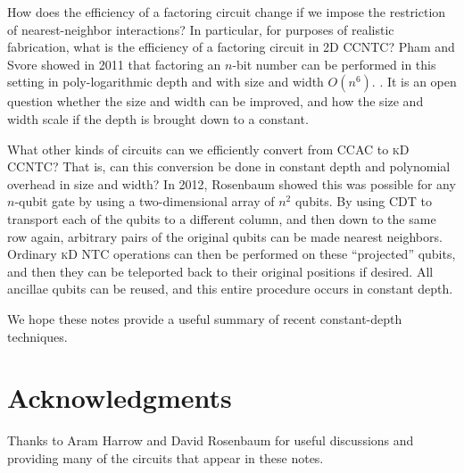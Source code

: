 \documentclass{article}
\begin{document}
How does the efficiency of a factoring circuit change if we impose the
restriction of nearest-neighbor interactions? In particular, for purposes
of realistic fabrication, what is the efficiency of a factoring circuit in
\textsc{2D CCNTC}? Pham and Svore showed in 2011 that factoring an $n$-bit
number can be
performed in this setting in poly-logarithmic depth and with size
and width $O(n^6)$. \cite{Pham2012b}. It is an open question whether the
size and width can be improved, and how the size and width scale if the depth
is brought down to a constant.

What other kinds of circuits can we efficiently convert
from \textsc{CCAC} to \textsc{kD CCNTC}? That is, can this conversion
be done in constant depth and
polynomial overhead in size and width? In 2012,
Rosenbaum \cite{Rosenbaum2012} showed this was possible for any $n$-qubit gate
by using a two-dimensional array of $n^2$ qubits. By using \textsc{CDT} to
transport each of the qubits to a different column, and then down to the
same row again, arbitrary pairs of the original qubits can be made
nearest neighbors. Ordinary \textsc{kD NTC} operations can then be
performed on these ``projected'' qubits, and then they can be teleported back
to their original positions if desired. All ancillae qubits can be reused,
and this entire procedure occurs in constant depth.

We hope these notes provide a useful summary of recent
constant-depth techniques.

\section{Acknowledgments}

Thanks to Aram Harrow and David Rosenbaum for useful discussions and
providing many of the circuits that appear in these notes.



\end{document}
